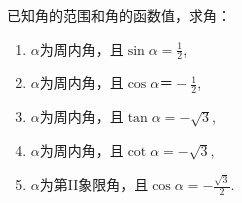 \begin{example}
    已知角的范围和角的函数值，求角：
    \begin{multicols}{2}
\begin{enumerate}[(1)]
\item $\alpha$为周内角，且$\sin\alpha=\frac{1}{2}$,
\item $\alpha$为周内角，且$\cos\alpha＝-\frac{1}{2}$,
\item $\alpha$为周内角，且$\tan\alpha=-\sqrt{3}$,
\item $\alpha$为周内角，且$\cot\alpha=-\sqrt{3}$,
\item $\alpha$为第II象限角，且$\cos\alpha=-\frac{\sqrt{3}}{2}$.
\end{enumerate}
\end{multicols}
\end{example}

